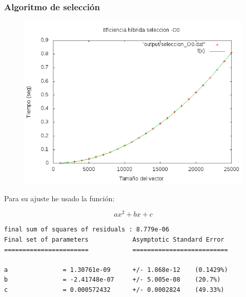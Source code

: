 \documentclass[spanish]{beamer}
\begin{document}
\begin{frame}\frametitle{Algoritmo de selección}
  \begin{figure}[H]
    \centering   
        \includegraphics[clip,width=1\columnwidth]{../../plots/seleccion_O0_fit.png}%
    \end{figure}
  \end{frame}

\begin{frame}[fragile]
  Para su ajuste he usado la función:

  $$ax^2+bx+c$$
  
\scriptsize
\begin{verbatim}
final sum of squares of residuals : 8.779e-06
Final set of parameters            Asymptotic Standard Error
=======================            ==========================

a               = 1.30761e-09      +/- 1.868e-12    (0.1429%)
b               = -2.41748e-07     +/- 5.005e-08    (20.7%)
c               = 0.000572432      +/- 0.0002824    (49.33%)
\end{verbatim}
  
  
\end{frame}

%
%
\end{document}

